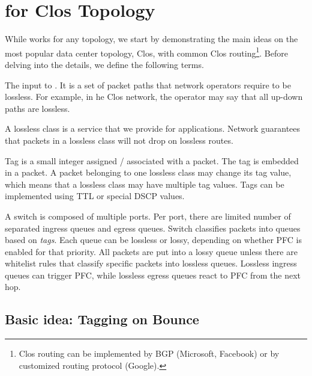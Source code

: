 \section{\sysname{} for Clos Topology}
\label{sec:specific}

While \sysname{} works for any topology, we start by demonstrating the main
ideas on the most popular data center topology, Clos, with common Clos
routing\footnote{Clos routing can be implemented by BGP (Microsoft, Facebook) or
by customized routing protocol (Google).}.  Before delving into the details, we
define the following terms.

 The input to \sysname{}. It is a set of packet paths
that network operators require to be lossless. For example, in he Clos network,
the operator may say that all up-down paths are lossless.

 A lossless class is a service that we provide for
applications.  Network guarantees that packets in a lossless class will not drop
on lossless routes. 

 Tag is a small integer assigned / associated with a packet. The tag
is embedded in a packet. A packet belonging to one lossless class may change its
tag value, which means that a lossless class may have multiple tag values. Tags
can be implemented using TTL or special DSCP values.

 A switch is composed of multiple ports.  Per port, there
are limited number of separated ingress queues and egress queues.  Switch
classifies packets into queues based on {\em tags}.  Each queue can be lossless
or lossy, depending on whether PFC is enabled for that priority.  All packets
are put into a lossy queue unless there are whitelist rules that classify
specific packets into lossless queues. Lossless ingress queues can trigger PFC,
while lossless egress queues react to PFC from the next hop.

\subsection{Basic idea: Tagging on Bounce}\label{subsec:tag}


